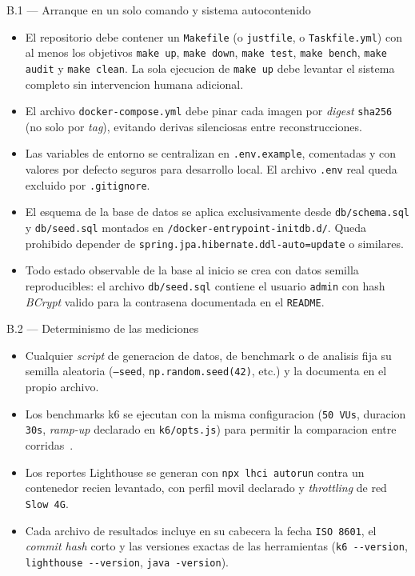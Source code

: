 \documentclass[11pt,a4paper]{article}
\begin{document}
\begin{cajarepo}{B.1 --- Arranque en un solo comando y sistema autocontenido}
    \begin{itemize}
        \item El repositorio debe contener un \texttt{Makefile} (o \texttt{justfile}, o \texttt{Taskfile.yml}) con al menos los objetivos \texttt{make up}, \texttt{make down}, \texttt{make test}, \texttt{make bench}, \texttt{make audit} y \texttt{make clean}. La sola ejecucion de \texttt{make up} debe levantar el sistema completo sin intervencion humana adicional.
        \item El archivo \texttt{docker-compose.yml} debe pinar cada imagen por \emph{digest} \texttt{sha256} (no solo por \emph{tag}), evitando derivas silenciosas entre reconstrucciones.
        \item Las variables de entorno se centralizan en \texttt{.env.example}, comentadas y con valores por defecto seguros para desarrollo local. El archivo \texttt{.env} real queda excluido por \texttt{.gitignore}.
        \item El esquema de la base de datos se aplica exclusivamente desde \texttt{db/schema.sql} y \texttt{db/seed.sql} montados en \texttt{/docker-entrypoint-initdb.d/}. Queda prohibido depender de \texttt{spring.jpa.hibernate.ddl-auto=update} o similares.
        \item Todo estado observable de la base al inicio se crea con datos semilla reproducibles: el archivo \texttt{db/seed.sql} contiene el usuario \texttt{admin} con hash \emph{BCrypt} valido para la contrasena documentada en el \texttt{README}.
    \end{itemize}
\end{cajarepo}

\begin{cajarepo}{B.2 --- Determinismo de las mediciones}
    \begin{itemize}
        \item Cualquier \emph{script} de generacion de datos, de benchmark o de analisis fija su semilla aleatoria (\texttt{--seed}, \texttt{np.random.seed(42)}, etc.) y la documenta en el propio archivo.
        \item Los benchmarks k6 se ejecutan con la misma configuracion (\texttt{50 VUs}, duracion \texttt{30s}, \emph{ramp-up} declarado en \texttt{k6/opts.js}) para permitir la comparacion entre corridas~\cite{ortega2022securecoding}.
        \item Los reportes Lighthouse se generan con \texttt{npx lhci autorun} contra un contenedor recien levantado, con perfil movil declarado y \emph{throttling} de red \texttt{Slow 4G}.
        \item Cada archivo de resultados incluye en su cabecera la fecha \texttt{ISO 8601}, el \emph{commit hash} corto y las versiones exactas de las herramientas (\texttt{k6 -{-}version}, \texttt{lighthouse -{-}version}, \texttt{java -version}).
    \end{itemize}
\end{cajarepo}
\end{document}

